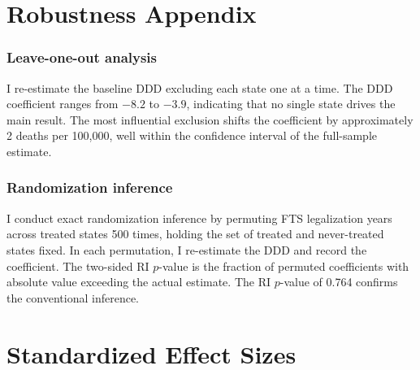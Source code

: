 \documentclass[12pt]{article}
\begin{document}
\section{Robustness Appendix}

\subsubsection*{Leave-one-out analysis}
I re-estimate the baseline DDD excluding each state one at a time. The DDD coefficient ranges from $-8.2$ to $-3.9$, indicating that no single state drives the main result. The most influential exclusion shifts the coefficient by approximately 2 deaths per 100,000, well within the confidence interval of the full-sample estimate.

\subsubsection*{Randomization inference}
I conduct exact randomization inference by permuting FTS legalization years across treated states 500 times, holding the set of treated and never-treated states fixed. In each permutation, I re-estimate the DDD and record the coefficient. The two-sided RI $p$-value is the fraction of permuted coefficients with absolute value exceeding the actual estimate. The RI $p$-value of 0.764 confirms the conventional inference.

\section{Standardized Effect Sizes}
\label{sec:sde}


\end{document}
